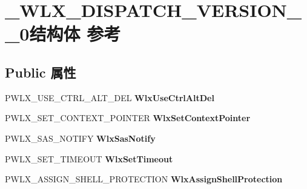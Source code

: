 \hypertarget{struct___w_l_x___d_i_s_p_a_t_c_h___v_e_r_s_i_o_n__1__0}{}\section{\+\_\+\+W\+L\+X\+\_\+\+D\+I\+S\+P\+A\+T\+C\+H\+\_\+\+V\+E\+R\+S\+I\+O\+N\+\_\+\_\+0结构体 参考}
\label{struct___w_l_x___d_i_s_p_a_t_c_h___v_e_r_s_i_o_n__1__0}
\subsection*{Public 属性}
\begin{DoxyCompactItemize}
\item 
\mbox{\label{struct___w_l_x___d_i_s_p_a_t_c_h___v_e_r_s_i_o_n__1__0_a4d80b3d1ba9433d6979f1e0f29fd8e81}} 
P\+W\+L\+X\+\_\+\+U\+S\+E\+\_\+\+C\+T\+R\+L\+\_\+\+A\+L\+T\+\_\+\+D\+EL {\bfseries Wlx\+Use\+Ctrl\+Alt\+Del}
\item 
\mbox{\label{struct___w_l_x___d_i_s_p_a_t_c_h___v_e_r_s_i_o_n__1__0_ab69e3f4b9962ee880b7f32b57be1e52d}} 
P\+W\+L\+X\+\_\+\+S\+E\+T\+\_\+\+C\+O\+N\+T\+E\+X\+T\+\_\+\+P\+O\+I\+N\+T\+ER {\bfseries Wlx\+Set\+Context\+Pointer}
\item 
\mbox{\label{struct___w_l_x___d_i_s_p_a_t_c_h___v_e_r_s_i_o_n__1__0_a2a93cfb69da039b569fe15fa3e4d420c}} 
P\+W\+L\+X\+\_\+\+S\+A\+S\+\_\+\+N\+O\+T\+I\+FY {\bfseries Wlx\+Sas\+Notify}
\item 
\mbox{\label{struct___w_l_x___d_i_s_p_a_t_c_h___v_e_r_s_i_o_n__1__0_aedbe10160b3fc67977803e024239ddcd}} 
P\+W\+L\+X\+\_\+\+S\+E\+T\+\_\+\+T\+I\+M\+E\+O\+UT {\bfseries Wlx\+Set\+Timeout}
\item 
\mbox{\label{struct___w_l_x___d_i_s_p_a_t_c_h___v_e_r_s_i_o_n__1__0_aa4af32439815775e117db8fe7a679d63}} 
P\+W\+L\+X\+\_\+\+A\+S\+S\+I\+G\+N\+\_\+\+S\+H\+E\+L\+L\+\_\+\+P\+R\+O\+T\+E\+C\+T\+I\+ON {\bfseries Wlx\+Assign\+Shell\+Protection}

\end{DoxyCompactItemize}
